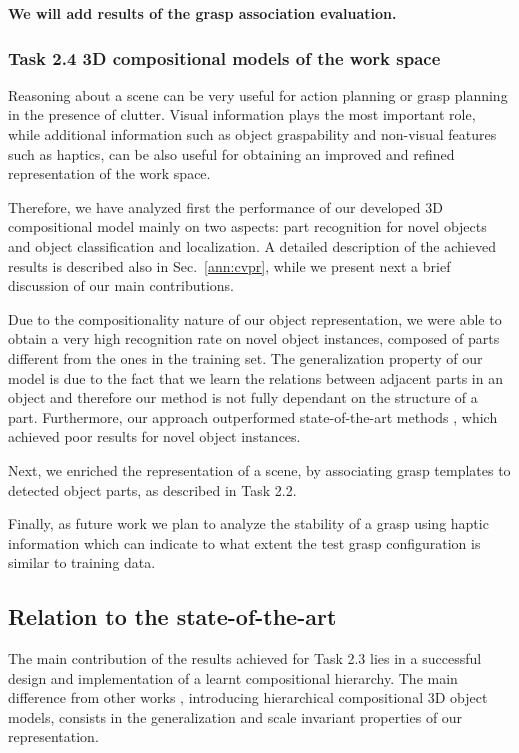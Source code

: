 \documentclass[a4paper,11pt,pdf]{pacmanreport}
\begin{document}
\textbf{We will add results of the grasp association evaluation.}

\subsubsection{Task 2.4 3D compositional models of the work space}

Reasoning about a scene can be very useful for action planning or grasp planning in the presence of clutter. Visual information plays the most important role, while additional information such as object graspability and non-visual features such as haptics, can be also useful for obtaining an improved and refined representation of the work space.

Therefore, we have analyzed first the performance of our developed 3D compositional model mainly on two aspects: part recognition for novel objects and object classification and localization. A detailed description of the achieved results is described also in Sec.~\ref{ann:cvpr}, while we present next a brief discussion of our main contributions.

Due to the compositionality nature of our object representation, we were able to obtain a very high recognition rate on novel object instances, composed of parts different from the ones in the training set. The generalization property of our model is due to the fact that we learn the relations between adjacent parts in an object and therefore our method is not fully dependant on the structure of a part. Furthermore, our approach outperformed state-of-the-art methods \cite{vfh}, which achieved poor results for novel object instances.

Next, we enriched the representation of a scene, by associating grasp templates to detected object parts, as described in Task 2.2.

Finally, as future work we plan to analyze the stability of a grasp using haptic information which can indicate to what extent the test grasp configuration is similar to training data.

\subsection{Relation to the state-of-the-art}

The main contribution of the results achieved for Task 2.3 lies in a successful design and implementation of a learnt compositional hierarchy. The main difference from other works \cite{rel2},\cite{comp2} introducing hierarchical compositional 3D object models, consists in the generalization and scale invariant properties of our representation. 
\end{document}
